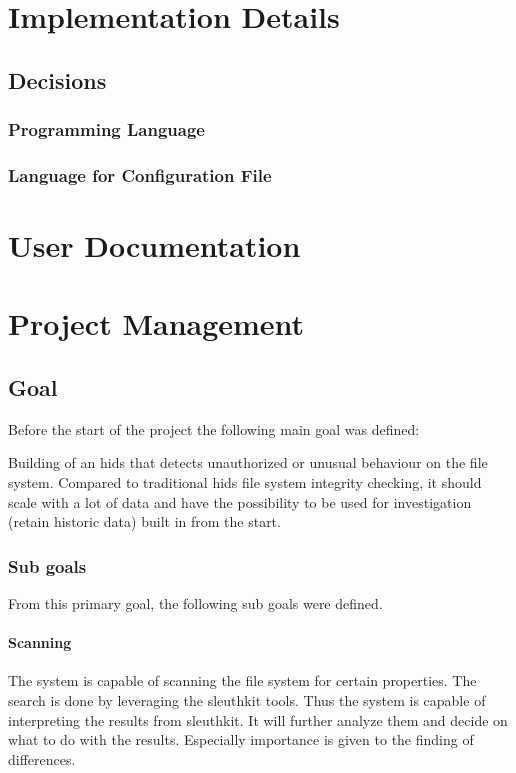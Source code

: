\documentclass[
	a4paper,					%
	10pt,							%
	twoside,					%
	openright,				%
	notitlepage,			%
	parskip=half,			%
]{scrreprt}					%
\begin{document}
\chapter{Implementation Details}

\section{Decisions}
\label{sec:decisions}

\subsection{Programming Language}
\label{sec:decisions:language}

\subsection{Language for Configuration File}
\label{sec:decisions:config:language}


\chapter{User Documentation}

\chapter{Project Management}

\section{Goal}
\label{apdx-sec:goal}
Before the start of the project the following main goal was defined:

Building of an \gls{hids} that detects unauthorized or unusual behaviour on the file system. Compared to traditional \gls{hids} file system integrity checking, it should scale with a lot of data and have the possibility to be used for investigation (retain historic data) built in from the start.

\subsection{Sub goals}

From this primary goal, the following sub goals were defined. 

\subsubsection{Scanning}
The system is capable of scanning the file system for certain properties. The search is done by leveraging the sleuthkit tools. Thus the system is capable of interpreting the results from sleuthkit. It will further analyze them and decide on what to do with the results. Especially importance is given to the finding of differences.
\end{document}
